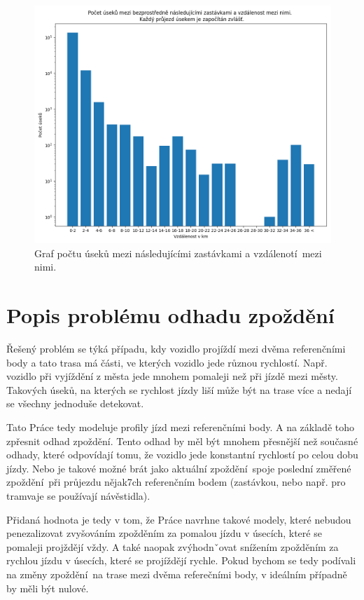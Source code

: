 \begin{figure}
  \includegraphics[width=\linewidth]{../img/stop_distances_plot_2020-02-20.png}
  \caption{Graf počtu úseků mezi následujícími zastávkami a vzdálenotí mezi nimi.}
  \label{fig:stop_distances_result}
\end{figure}

\section{Popis problému odhadu zpoždění}

Řešený problém se týká případu, kdy vozidlo projíždí mezi dvěma referenčními body a tato trasa má části, ve kterých vozidlo jede různou rychlostí. Např. vozidlo při vyjíždění z města jede mnohem pomaleji než při jízdě mezi městy. Takových úseků, na kterých se rychlost jízdy liší může být na trase více a nedají se všechny jednoduše detekovat.

\bigbreak

Tato Práce tedy modeluje profily jízd mezi referenčními body. A na základě toho zpřesnit odhad zpoždění. Tento odhad by měl být mnohem přesnější než současné odhady, které odpovídají tomu, že vozidlo jede konstantní rychlostí po celou dobu jízdy. Nebo je takové možné brát jako aktuální zpoždění spoje poslední změřené zpoždění při průjezdu nějak7ch referenčním bodem (zastávkou, nebo např. pro tramvaje se používají návěstidla).

\bigbreak

Přidaná hodnota je tedy v tom, že Práce navrhne takové modely, které nebudou penezalizovat zvyšováním zpožděním za pomalou jízdu v úsecích, které se pomaleji projždějí vždy. A také naopak zvýhodnˇovat snížením zpožděním za rychlou jízdu v úsecích, které se projíždějí rychle. Pokud bychom se tedy podívali na změny zpoždění na trase mezi dvěma referečními body, v ideálním případně by měli být nulové.

